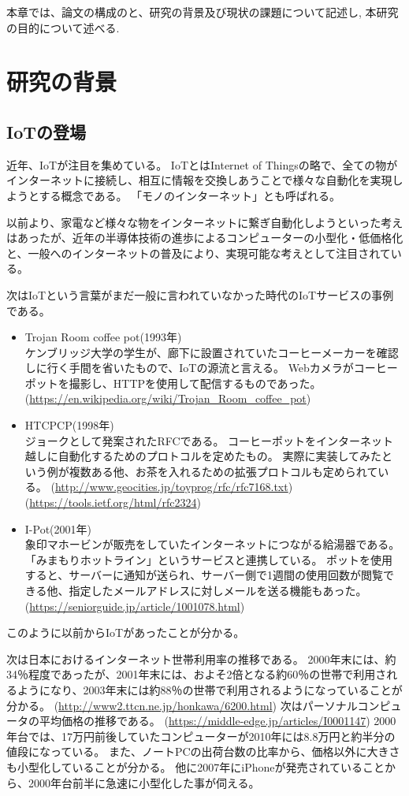 本章では、論文の構成のと、研究の背景及び現状の課題について記述し, 本研究の目的について述べる.
\section{研究の背景}
\subsection{IoTの登場}
近年、IoTが注目を集めている。
IoTとはInternet of Thingsの略で、全ての物がインターネットに接続し、相互に情報を交換しあうことで様々な自動化を実現しようとする概念である。
「モノのインターネット」とも呼ばれる。

以前より、家電など様々な物をインターネットに繋ぎ自動化しようといった考えはあったが、近年の半導体技術の進歩によるコンピューターの小型化・低価格化と、一般へのインターネットの普及により、実現可能な考えとして注目されている。

次はIoTという言葉がまだ一般に言われていなかった時代のIoTサービスの事例である。
\begin{itemize}
\item Trojan Room coffee pot(1993年)\\
	ケンブリッジ大学の学生が、廊下に設置されていたコーヒーメーカーを確認しに行く手間を省いたもので、IoTの源流と言える。
	Webカメラがコーヒーポットを撮影し、HTTPを使用して配信するものであった。
	(\url{https://en.wikipedia.org/wiki/Trojan_Room_coffee_pot})
\item HTCPCP(1998年)\\
	ジョークとして発案されたRFCである。
	コーヒーポットをインターネット越しに自動化するためのプロトコルを定めたもの。
	実際に実装してみたという例が複数ある他、お茶を入れるための拡張プロトコルも定められている。
	(\url{http://www.geocities.jp/toyprog/rfc/rfc7168.txt})
	(\url{https://tools.ietf.org/html/rfc2324})
\item I-Pot(2001年)\\
	象印マホービンが販売をしていたインターネットにつながる給湯器である。「みまもりホットライン」というサービスと連携している。
	ポットを使用すると、サーバーに通知が送られ、サーバー側で1週間の使用回数が閲覧できる他、指定したメールアドレスに対しメールを送る機能もあった。
	(\url{https://seniorguide.jp/article/1001078.html})
\end{itemize}
このように以前からIoTがあったことが分かる。

次は日本におけるインターネット世帯利用率の推移である。
2000年末には、約34％程度であったが、2001年末には、およそ2倍となる約60％の世帯で利用されるようになり、2003年末には約88％の世帯で利用されるようになっていることが分かる。
(\url{http://www2.ttcn.ne.jp/honkawa/6200.html})
次はパーソナルコンピュータの平均価格の推移である。
(\url{https://middle-edge.jp/articles/I0001147})
2000年台では、17万円前後していたコンピューターが2010年には8.8万円と約半分の値段になっている。
また、ノートPCの出荷台数の比率から、価格以外に大きさも小型化していることが分かる。
他に2007年にiPhoneが発売されていることから、2000年台前半に急速に小型化した事が伺える。

